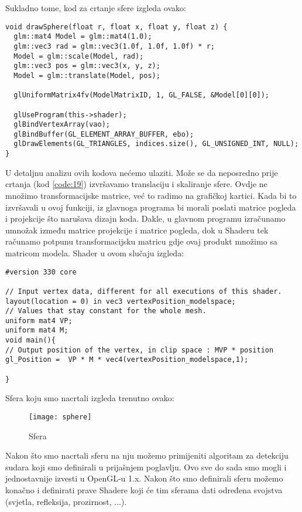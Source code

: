 Sukladno tome, kod za crtanje sfere izgleda ovako:
\begin{lstlisting}[style = myC++, label =  {code:19-1}, caption = {Kod za crtanje sfere}]
void drawSphere(float r, float x, float y, float z) {
  glm::mat4 Model = glm::mat4(1.0);
  glm::vec3 rad = glm::vec3(1.0f, 1.0f, 1.0f) * r;
  Model = glm::scale(Model, rad);
  glm::vec3 pos = glm::vec3(x, y, z);
  Model = glm::translate(Model, pos);
  
  glUniformMatrix4fv(ModelMatrixID, 1, GL_FALSE, &Model[0][0]);
  
  glUseProgram(this->shader);
  glBindVertexArray(vao);
  glBindBuffer(GL_ELEMENT_ARRAY_BUFFER, ebo);
  glDrawElements(GL_TRIANGLES, indices.size(), GL_UNSIGNED_INT, NULL);
}

\end{lstlisting}
U detaljnu analizu ovih kodova nećemo ulaziti. Može se da neposredno prije crtanja (kod \ref{code:19}) izvršavamo translaciju i skaliranje sfere. Ovdje ne množimo transformacijske matrice, već to radimo na grafičkoj kartici. Kada bi to izvršavali u ovoj funkciji, iz glavnoga programa bi morali poslati matrice pogleda i projekcije što narušava dizajn koda. Dakle, u glavnom programu izračunamo umnožak između matrice projekcije i matrice pogleda, dok u Shaderu tek računamo potpunu transformacijsku matricu gdje ovaj produkt množimo sa matricom modela. Shader u ovom slučaju izgleda:
\begin{lstlisting}[style = myC++ , label = {code:20}, caption = {Množenje matrica u Shaderu}]
#version 330 core

// Input vertex data, different for all executions of this shader.
layout(location = 0) in vec3 vertexPosition_modelspace;
// Values that stay constant for the whole mesh.
uniform mat4 VP;
uniform mat4 M;
void main(){
// Output position of the vertex, in clip space : MVP * position
gl_Position =  VP * M * vec4(vertexPosition_modelspace,1);

}
\end{lstlisting}
Sfera koju smo nacrtali izgleda trenutno ovako:
\begin{figure}[!http]
	\begin{center}
		\texttt{[image: sphere]}
		\caption{Sfera}
		\label{fig:32}
	\end{center}
\end{figure}

Nakon što smo nacrtali sferu na nju možemo primijeniti algoritam za detekciju sudara koji smo definirali u prijašnjem poglavlju. Ovo sve do sada smo mogli i jednostavnije izvesti u OpenGL-u 1.x. Nakon što smo definirali sferu možemo konačno i definirati prave Shadere koji će tim sferama dati određena svojstva (svjetla, refleksija, prozirnost, ...).

